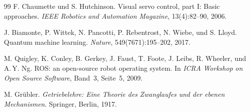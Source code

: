 ﻿\documentclass[a4paper,12pt]{article}
\theoremstyle{definition}
\begin{document}
\begin{thebibliography}{99}
F. Chaumette und S. Hutchinson.
\newblock Visual servo control, part I: Basic approaches.
\newblock \emph{IEEE Robotics and Automation Magazine}, 13(4):82--90, 2006.

J. Biamonte, P. Wittek, N. Pancotti, P. Rebentrost, N. Wiebe, und S. Lloyd.
\newblock Quantum machine learning.
\newblock \emph{Nature}, 549(7671):195--202, 2017.

M. Quigley, K. Conley, B. Gerkey, J. Faust, T. Foote, J. Leibs, R. Wheeler,
  und A.\,Y. Ng.
\newblock ROS: an open-source robot operating system.
\newblock In \emph{ICRA Workshop on Open Source Software}, Band~3, Seite~5,
  2009.

M. Gr{\"u}bler.
\newblock \emph{Getriebelehre: Eine Theorie des Zwanglaufes und der ebenen
  Mechanismen}.
\newblock Springer, Berlin, 1917.

\end{thebibliography}
\end{document}
